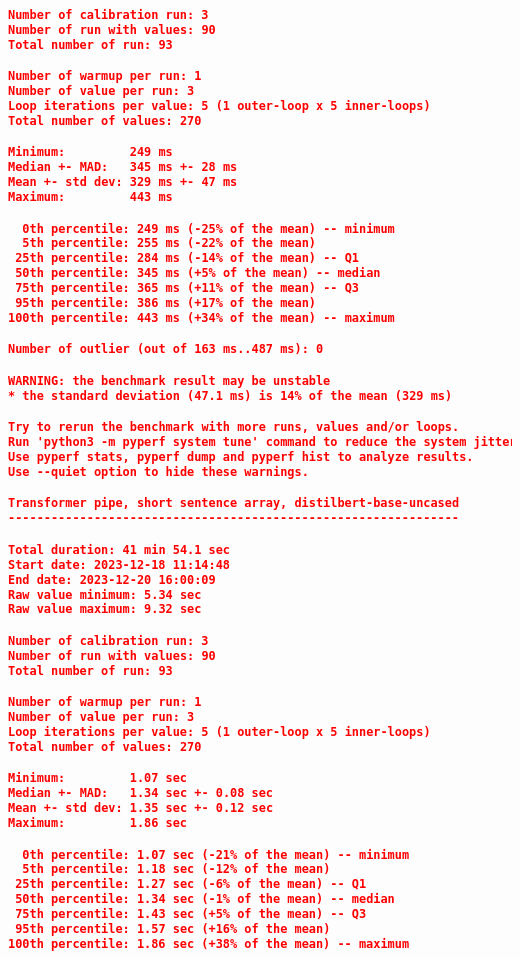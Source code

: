 \begin{lstlisting}[language=json]
Number of calibration run: 3
Number of run with values: 90
Total number of run: 93

Number of warmup per run: 1
Number of value per run: 3
Loop iterations per value: 5 (1 outer-loop x 5 inner-loops)
Total number of values: 270

Minimum:         249 ms
Median +- MAD:   345 ms +- 28 ms
Mean +- std dev: 329 ms +- 47 ms
Maximum:         443 ms

  0th percentile: 249 ms (-25% of the mean) -- minimum
  5th percentile: 255 ms (-22% of the mean)
 25th percentile: 284 ms (-14% of the mean) -- Q1
 50th percentile: 345 ms (+5% of the mean) -- median
 75th percentile: 365 ms (+11% of the mean) -- Q3
 95th percentile: 386 ms (+17% of the mean)
100th percentile: 443 ms (+34% of the mean) -- maximum

Number of outlier (out of 163 ms..487 ms): 0

WARNING: the benchmark result may be unstable
* the standard deviation (47.1 ms) is 14% of the mean (329 ms)

Try to rerun the benchmark with more runs, values and/or loops.
Run 'python3 -m pyperf system tune' command to reduce the system jitter.
Use pyperf stats, pyperf dump and pyperf hist to analyze results.
Use --quiet option to hide these warnings.

Transformer pipe, short sentence array, distilbert-base-uncased
---------------------------------------------------------------

Total duration: 41 min 54.1 sec
Start date: 2023-12-18 11:14:48
End date: 2023-12-20 16:00:09
Raw value minimum: 5.34 sec
Raw value maximum: 9.32 sec

Number of calibration run: 3
Number of run with values: 90
Total number of run: 93

Number of warmup per run: 1
Number of value per run: 3
Loop iterations per value: 5 (1 outer-loop x 5 inner-loops)
Total number of values: 270

Minimum:         1.07 sec
Median +- MAD:   1.34 sec +- 0.08 sec
Mean +- std dev: 1.35 sec +- 0.12 sec
Maximum:         1.86 sec

  0th percentile: 1.07 sec (-21% of the mean) -- minimum
  5th percentile: 1.18 sec (-12% of the mean)
 25th percentile: 1.27 sec (-6% of the mean) -- Q1
 50th percentile: 1.34 sec (-1% of the mean) -- median
 75th percentile: 1.43 sec (+5% of the mean) -- Q3
 95th percentile: 1.57 sec (+16% of the mean)
100th percentile: 1.86 sec (+38% of the mean) -- maximum


\end{lstlisting}

